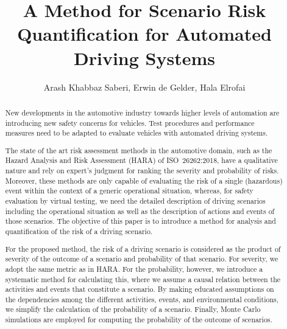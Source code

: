 \documentclass[letterpaper, 10 pt, conference]{ieeeconf}  %
\title{\LARGE \bf
A Method for Scenario Risk Quantification for Automated Driving Systems
}
\author{Arash Khabbaz Saberi, Erwin de Gelder, Hala Elrofai}
\begin{document}
\maketitle
\thispagestyle{empty}
\pagestyle{empty}


\begin{abstract}
	
	



	
New developments in the automotive industry towards higher levels of automation are introducing new safety concerns for vehicles. 
Test procedures and performance measures need to be adapted to evaluate vehicles with automated driving systems. 


The state of the art risk assessment methods in the automotive domain, 
	such as the Hazard Analysis and Risk Assessment (HARA) of ISO~26262:2018, 
	have a qualitative nature and rely on expert's judgment for ranking the severity and probability of risks.
Moreover, these methods are only capable of evaluating the risk of a single (hazardous) event 
	within the context of a generic operational situation, whereas, for safety evaluation by virtual testing, we need the detailed description of driving scenarios including the operational situation
	as well as the description of actions and events of those scenarios. 
The objective of this paper is to introduce a method for analysis and quantification of the risk of a driving scenario.

For the proposed method, the risk of a driving scenario is considered as the product of severity of the outcome of a scenario and probability of that scenario.
For severity, we adopt the same metric as in HARA. For the probability, however, we introduce a systematic method for calculating this, 
	where we assume a causal relation between the activities and events that constitute a scenario. 
By making educated assumptions on the dependencies among the different activities, events, and environmental conditions, 
	we simplify the calculation of the probability of a scenario. 
Finally, Monte Carlo simulations are employed for computing the probability of the outcome of scenarios.


\end{abstract}
\end{document}
